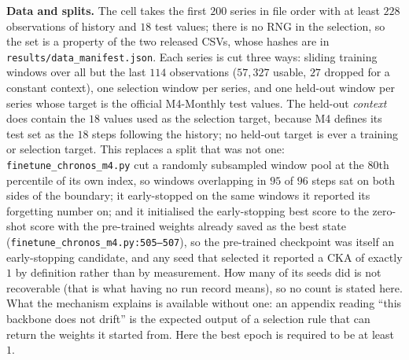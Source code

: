 \textbf{Data and splits.}  The cell takes the first $200$ series in file order
with at least $228$ observations of history and $18$ test values; there is no RNG
in the selection, so the set is a property of the two released CSVs, whose hashes
are in \texttt{results/data\_manifest.json}.  Each series is cut three ways:
sliding training windows over all but the last $114$ observations
($57{,}327$ usable, $27$ dropped for a constant context), one selection window
per series, and one held-out window per series whose target is the official
M4-Monthly test values.  The held-out \emph{context} does contain the $18$ values
used as the selection target, because M4 defines its test set as the $18$ steps
following the history; no held-out target is ever a training or selection target.
This replaces a split that was not one: \texttt{finetune\_chronos\_m4.py} cut a
randomly subsampled window pool at the $80$th percentile of its own index, so
windows overlapping in $95$ of $96$ steps sat on both sides of the boundary; it
early-stopped on the same windows it reported its forgetting number on; and it
initialised the early-stopping best score to the zero-shot score with the
pre-trained weights already saved as the best state
(\texttt{finetune\_chronos\_m4.py:505--507}), so the pre-trained checkpoint was
itself an early-stopping candidate, and any seed that selected it reported a CKA
of exactly $1$ by definition rather than by measurement.  How many of its seeds
did is not recoverable (that is what having no run record means), so no count
is stated here.  What the mechanism explains is available without one: an
appendix reading ``this backbone does not drift'' is the expected output of a
selection rule that can return the weights it started from.  Here the best epoch
is required to be at least $1$.

\begin{table}[ht]
\centering
\caption{\textbf{The corrected value gate for Chronos/M4-Monthly.}  Ten
denominators against one numerator (median of $20$ Chronos samples, per-window
$z$-scored), on both splits.  A denominator worse than \texttt{constant}, the
training-mean predictor, cannot support a claim that the checkpoint has
something worth preserving: it inflates $\Vb{b}$ in the direction that flatters
the checkpoint, which is precisely the defect that moved $17$ of $21$ Moirai
cells when it was corrected (Appendix~\ref{app:gatecorrection}).}
\label{tab:chronosm4gate}

\end{table}

